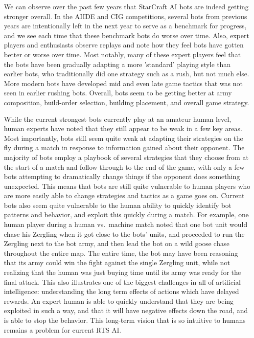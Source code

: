 We can observe over the past few years that StarCraft AI bots are indeed getting stronger overall. In the AIIDE and CIG competitions, several bots from previous years are intentionally left in the next year to serve as a benchmark for progress, and we see each time that these benchmark bots do worse over time. Also, expert players and enthusiasts observe replays and note how they feel bots have gotten better or worse over time. Most notably, many of these expert players feel that the bots have been gradually adapting a more 'standard' playing style than earlier bots, who traditionally did one strategy such as a rush, but not much else. More modern bots have developed mid and even late game tactics that was not seen in earlier rushing bots. Overall, bots seem to be getting better at army composition, build-order selection, building placement, and overall game strategy. 

While the current strongest bots currently play at an amateur human level, human experts have noted that they still appear to be weak in a few key areas. Most importantly, bots still seem quite weak at adapting their strategies on the fly during a match in response to information gained about their opponent. The majority of bots employ a playbook of several strategies that they choose from at the start of a match and follow through to the end of the game, with only a few bots attempting to dramatically change things if the opponent does something unexpected. This means that bots are still quite vulnerable to human players who are more easily able to change strategies and tactics as a game goes on. Current bots also seem quite vulnerable to the human ability to quickly identify bot patterns and behavior, and exploit this quickly during a match. For example, one human player during a human vs.\ machine match noted that one bot unit would chase his Zergling when it got close to the bots' units, and proceeded to run the Zergling next to the bot army, and then lead the bot on a wild goose chase throughout the entire map. The entire time, the bot may have been reasoning that its army could win the fight against the single Zergling unit, while not realizing that the human was just buying time until its army was ready for the final attack. This also illustrates one of the biggest challenges in all of artificial intelligence: understanding the long term effects of actions which have delayed rewards. An expert human is able to quickly understand that they are being exploited in such a way, and that it will have negative effects down the road, and is able to stop the behavior. This long-term vision that is so intuitive to humans remains a problem for current RTS AI.



